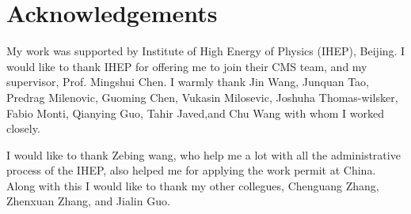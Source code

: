 \chapter*{Acknowledgements}

My work was supported by Institute of High Energy of Physics (IHEP), Beijing.
I would like to thank IHEP for offering me to join their CMS team, and my supervisor, Prof. Mingshui Chen. I warmly thank Jin Wang, Junquan Tao, Predrag Milenovic, Guoming Chen, Vukasin Milosevic, Joshuha Thomas-wilsker, Fabio Monti, Qianying Guo, Tahir Javed,and Chu Wang with whom I worked closely. 

I would like to thank Zebing wang, who help me a lot with all the administrative process of the IHEP, also helped me for applying the work permit at China. Along with this I would like to thank my other collegues, Chenguang Zhang, Zhenxuan Zhang, and Jialin Guo.